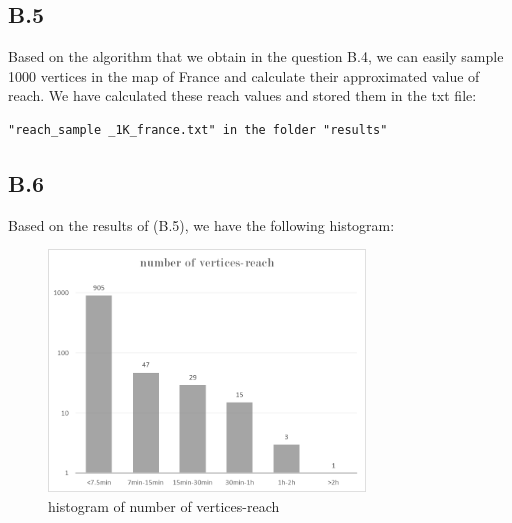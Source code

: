 \documentclass[titlepage,11pt,a4paper]{article}
\begin{document}
\subsection{B.5}
Based on the algorithm that we obtain in the question B.4, we can easily sample 1000 vertices in the map of France and calculate their approximated value of reach. We have calculated these reach values and stored them in the txt file:
\begin{verbatim}
"reach_sample _1K_france.txt" in the folder "results"
\end{verbatim}

\subsection{B.6}
Based on the results of (B.5), we have the following histogram:

\begin{figure}[h]
    \centering
    \includegraphics[width =0.75\textwidth]{reach.png}
    \caption{histogram of number of vertices-reach}
    \label{fig:reach}
\end{figure}
\end{document}

